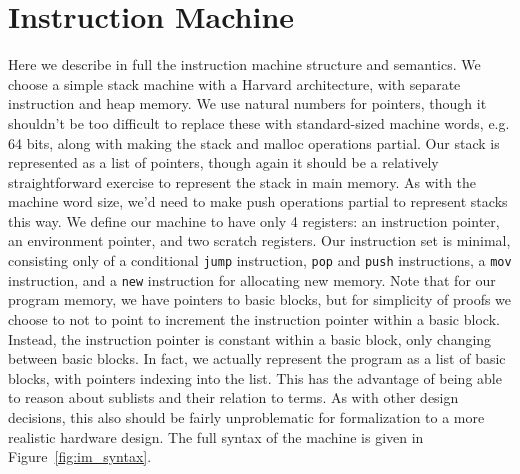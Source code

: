 \section{Instruction Machine} \label{sec:im_semantics}

Here we describe in full the instruction machine structure and semantics. We choose a simple
stack machine with a Harvard architecture, with separate instruction and
heap memory. We use natural numbers for pointers, though it shouldn't be too
difficult to replace these with standard-sized machine words, e.g. 64 bits,
along with making the stack and malloc operations partial. Our stack is
represented as a list of pointers, though again it should be a relatively
straightforward exercise to represent the stack in main memory. As with the
machine word size, we'd need to make push operations partial to represent stacks
this way. We define our machine to have only 4 registers: an instruction
pointer, an environment pointer, and two scratch registers. Our instruction set
is minimal, consisting only of a conditional \texttt{jump} instruction,
\texttt{pop} and \texttt{push} instructions, a \texttt{mov} instruction, and a
\texttt{new} instruction for allocating new memory. Note that for our program
memory, we have pointers to basic blocks, but for simplicity of proofs we choose
to not to point to increment the instruction pointer within a basic block.
Instead, the instruction pointer is constant within a basic block, only
changing between basic blocks. In fact, we actually represent the program as a
list of basic blocks, with pointers indexing into the list. This has the
advantage of being able to reason about sublists and their relation to terms. As
with other design decisions, this also should be fairly unproblematic for
formalization to a more realistic hardware design. The full syntax of the
machine is given in Figure~\ref{fig:im_syntax}.  


